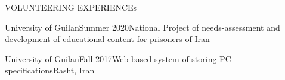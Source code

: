 \documentclass{resume} %
\begin{document}
\begin{rSection}{VOLUNTEERING EXPERIENCEs}

\begin{rSubsection}{University of Guilan}{Summer 2020}{National Project of needs-assessment and development of educational content for prisoners of Iran}{}
\end{rSubsection}

\begin{rSubsection}{University of Guilan}{Fall 2017}{Web-based system of storing PC specifications}{Rasht, Iran}
\end{rSubsection}

\end{rSection}
\end{document}
